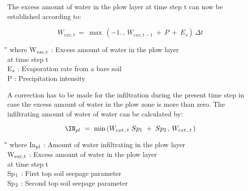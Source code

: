 \documentclass[11pt]{article}
\begin{document}
\bigskip
\bigskip
The excess amount of water in the plow layer at time step t can now be established
according to:

\begin{displaymath}
W _{exc,t} ~= ~\max \, (-1.\, ,\, W _{exc,t-1} ~+~ P ~+~E _{s} )\,\Delta t
\end{displaymath}

\bigskip
\nwln
\begin{tabbing}
\hspace{1.27cm}\=\hspace{1.27cm}\=\hspace{1.27cm}\=\hspace{1.27cm}\=%
\hspace{1.27cm}\=\hspace{1.27cm}\=\hspace{1.27cm}\=\hspace{1.27cm}\=%
\hspace{1.27cm}\=\hspace{1.27cm}\=\kill
where\> W$_{{\rm exc,t}}$\> : Excess amount of water in the plow layer \\
\>\>   at time step t\> \> \> \> \> \> \> \> [cm]\\
\>E$_{{\rm s}}$\> : Evaporation rate from a bare soil\> \> \> \> \> \> \> \> [cm d$^{{\rm -1}}$]\\
\>P \> : Precipitation intensity\> \> \> \> \> \> \> \> [cm d$^{{\rm -1}}$]
\end{tabbing}

\bigskip
\bigskip
A correction has to be made for the infiltration during the present time step in case the
excess amount of water in the plow zone is more than zero. The infiltrating amount of
water of water can be calculated by:

\begin{displaymath}
\IN _{pl} ~=~\min \, (W _{ext\, ,\, t} ~ Sp _{1} ~+~Sp _{2} \, ,\, W _{ext\, ,\, t} \, )
\end{displaymath}

\bigskip
\nwln
\begin{tabbing}
\hspace{1.27cm}\=\hspace{1.27cm}\=\hspace{1.27cm}\=\hspace{1.27cm}\=%
\hspace{1.27cm}\=\hspace{1.27cm}\=\hspace{1.27cm}\=\hspace{1.27cm}\=%
\hspace{1.27cm}\=\hspace{1.27cm}\=\kill
where\> In$_{{\rm pl}}$\> : Amount of water infiltrating in the plow layer\> \> \> \> \> \> \> \> [cm]\\
\>W$_{{\rm exc,t}}$\> : Excess amount of water in the plow layer \\
\>\>   at time step t\> \> \> \> \> \> \> \> [cm]\\
\>Sp$_{{\rm 1}}$\> : First top soil seepage parameter\> \> \> \> \> \> \> \> [-]\\
\>Sp$_{{\rm 2}}$\> : Second top soil seepage parameter\> \> \> \> \> \> \> \> [-]
\end{tabbing}
\end{document}
